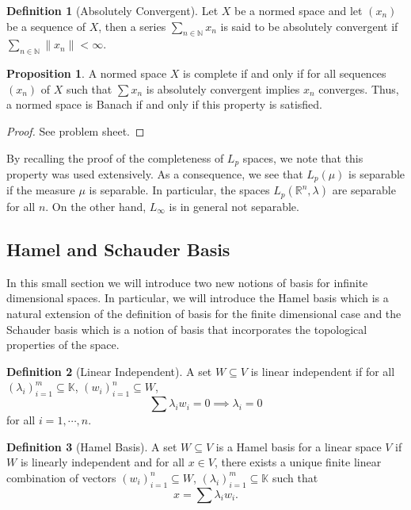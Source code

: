 \documentclass[]{article}
\theoremstyle{definition}
\theoremstyle{definition}
\newtheorem{definition}{Definition}[section]
\newtheorem{proposition}{Proposition}[section]
\begin{document}
\begin{definition}[Absolutely Convergent]
  Let \(X\) be a normed space and let \((x_n)\) be a sequence of \(X\), then 
  a series \(\sum_{n \in \mathbb{N}} x_n\) is said to be absolutely convergent 
  if \(\sum_{n \in \mathbb{N}} \|x_n\| < \infty\).
\end{definition}

\begin{proposition}
  A normed space \(X\) is complete if and only if for all sequences \((x_n)\) 
  of \(X\) such that \(\sum x_n\) is absolutely convergent implies \(x_n\) 
  converges. Thus, a normed space is Banach if and only if this property is 
  satisfied.
\end{proposition}
\begin{proof}
  See problem sheet.
\end{proof}

By recalling the proof of the completeness of \(L_p\) spaces, we note that 
this property was used extensively. As a consequence, we see that \(L_p(\mu)\) 
is separable if the measure \(\mu\) is separable. In particular, the spaces 
\(L_p(\mathbb{R}^n, \lambda)\) are separable for all \(n\). On the other hand, 
\(L_\infty\) is in general not separable.

\subsection{Hamel and Schauder Basis}

In this small section we will introduce two new notions of basis for infinite 
dimensional spaces. In particular, we will introduce the Hamel basis which is 
a natural extension of the definition of basis for the finite dimensional case 
and the Schauder basis which is a notion of basis that incorporates the 
topological properties of the space.

\begin{definition}[Linear Independent]
  A set \(W \subseteq V\) is linear independent if for all 
  \((\lambda_i)_{i = 1}^m \subseteq \mathbb{K}\), \((w_i)_{i = 1}^n \subseteq W\), 
  \[\sum \lambda_i w_i = 0 \implies \lambda_i = 0\]
  for all \(i = 1, \cdots, n\).
\end{definition}

\begin{definition}[Hamel Basis]
  A set \(W \subseteq V\) is a Hamel basis for a linear space \(V\) if 
  \(W\) is linearly independent and for all \(x \in V\), there exists a unique 
  finite linear combination of vectors \((w_i)_{i = 1}^n \subseteq W\), 
  \((\lambda_i)_{i = 1}^m \subseteq \mathbb{K}\) 
  such that 
  \[x = \sum \lambda_i w_i.\]
\end{definition}
\end{document}
